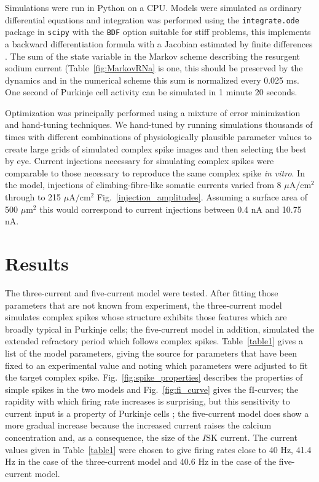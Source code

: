 \documentclass[twocolumn]{svjour3}          %
\newcommand{\sk}{\mathrm{SK}}
\begin{document}
Simulations were run in Python on a CPU. Models were simulated as
ordinary differential equations and integration was performed using
the \texttt{integrate.ode} package in \texttt{scipy} with the
\texttt{BDF} option suitable for stiff problems, this implements a
backward differentiation formula with a Jacobian estimated by finite
differences \citep{ByrneHindmarsh1975}. The sum of the state variable
in the Markov scheme describing the resurgent sodium current
(Table~\ref{fig:MarkovRNa} is one, this should be preserved by the
dynamics and in the numerical scheme this sum is normalized every
0.025 ms. One second of Purkinje cell activity can be simulated in 1
minute 20 seconds.

Optimization was principally performed using a mixture of error
minimization and hand-tuning techniques. We hand-tuned by running
simulations thousands of times with different combinations of
physiologically plausible parameter values to create large grids of
simulated complex spike images and then selecting the best by
eye. Current injections necessary for simulating complex spikes were
comparable to those necessary to reproduce the same complex spike
\textit{in vitro}. In the model, injections of climbing-fibre-like
somatic currents varied from 8 $\mu$A$/$cm$^2$ through to 215
$\mu$A$/$cm$^2$ Fig.~\ref{injection_amplitudes}. Assuming a surface
area of 500 $\mu$m$^2$ this would correspond to current injections
between 0.4 nA and 10.75 nA.

\section{Results}

The three-current and five-current model were tested. After fitting
those parameters that are not known from experiment, the three-current
model simulates complex spikes whose structure exhibits those features
which are broadly typical in Purkinje cells; the five-current model in
addition, simulated the extended refractory period which follows
complex spikes. Table~\ref{table1} gives a list of the model
parameters, giving the source for parameters that have been fixed to
an experimental value and noting which parameters were adjusted to fit
the target complex spike. Fig.~\ref{fig:spike_properties} describes
the properties of simple spikes in the two models and
Fig.~\ref{fig:fi_curve} gives the fI-curves; the rapidity with which
firing rate increases is surprising, but this sensitivity to current
input is a property of Purkinje cells \cite{DeSchutterBower1994a}; the
five-current model does show a more gradual increase because the
increased current raises the calcium concentration and, as a
consequence, the size of the $I\sk$ current. The current values given
in Table~\ref{table1} were chosen to give firing rates close to 40 Hz,
41.4 Hz in the case of the three-current model and 40.6 Hz in the case
of the five-current model.
\end{document}
